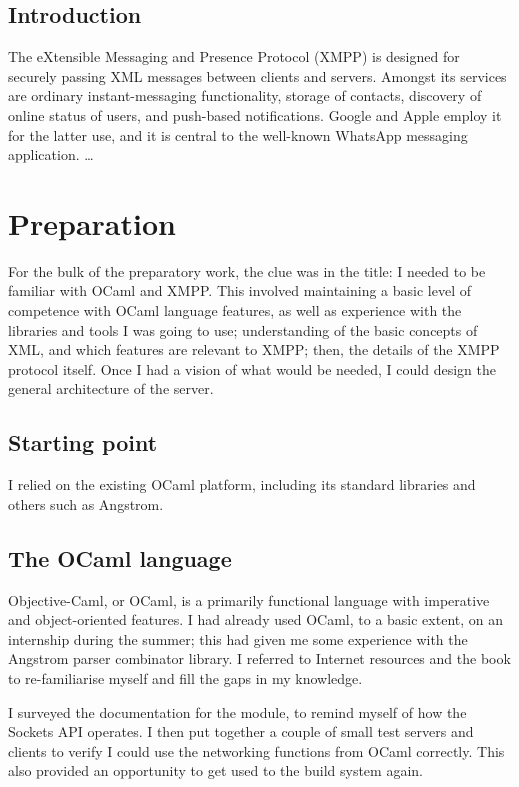 \documentclass[12pt,a4paper,twoside,openright]{report}
\begin{document}
{\tableofcontents


\pagestyle{headings}

\section{Introduction}
The eXtensible Messaging and Presence Protocol (XMPP) is designed for securely passing XML messages between clients and servers. Amongst its services are ordinary instant-messaging functionality, storage of contacts, discovery of online status of users, and push-based notifications. Google and Apple employ it for the latter use, and it is central to the well-known WhatsApp messaging application. \ldots

\chapter{Preparation}
For the bulk of the preparatory work, the clue was in the title: I needed to be familiar with OCaml and XMPP. This involved maintaining a basic level of competence with OCaml language features, as well as experience with the libraries and tools I was going to use; understanding of the basic concepts of XML, and which features are relevant to XMPP; then, the details of the XMPP protocol itself. Once I had a vision of what would be needed, I could design the general architecture of the server.

\section{Starting point}
I relied on the existing OCaml platform, including its standard libraries and others such as Angstrom.

\section{The OCaml language}
Objective-Caml, or OCaml, is a primarily functional language with imperative and object-oriented features. I had already used OCaml, to a basic extent, on an internship during the summer; this had given me some experience with the Angstrom parser combinator library. I referred to Internet resources and the  book to re-familiarise myself and fill the gaps in my knowledge.

I surveyed the documentation for the  module, to remind myself of how the Sockets API operates. I then put together a couple of small test servers and clients to verify I could use the networking functions from OCaml correctly. This also provided an opportunity to get used to the build system again.

}
\end{document}
